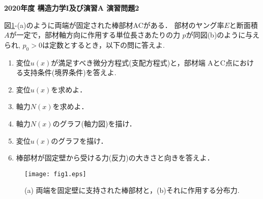 \documentclass[10pt,a4j]{jarticle}
\newlength{\minitwocolumn}
\begin{document}
\newcommand{\fat}[1]{\mbox{\boldmath $#1$}}
\newcommand{\D}{\partial}
\newcommand{\w}{\omega}
\newcommand{\ga}{\alpha}
\newcommand{\gb}{\beta}
\newcommand{\gx}{\xi}
\newcommand{\gz}{\zeta}
\newcommand{\vhat}[1]{\hat{\fat{#1}}}
\newcommand{\spc}{\vspace{0.7\baselineskip}}
\newcommand{\halfspc}{\vspace{0.3\baselineskip}}

\pagestyle{empty}
\newcommand{\twofig}[2]
 {
   \begin{figure}
     \begin{minipage}[t]{\minitwocolumn}
         \begin{center}   #1
         \end{center}
     \end{minipage}
         \hspace{\columnsep}
     \begin{minipage}[t]{\minitwocolumn}
         \begin{center} #2
         \end{center}
     \end{minipage}
   \end{figure}
 }
\begin{center}
	{\Large \bf 2020年度 構造力学I及び演習A 演習問題2 } \\
\end{center}
\vspace{15mm}
図\ref{fig:fig1}-(a)のように両端が固定された棒部材ACがある．
部材のヤング率$E$と断面積$A$が一定で，部材軸方向に作用する単位長さあたりの力
$p$が同図(b)のように与えられ, $p_0>0$は定数とするとき，以下の問に答えよ.
\begin{enumerate}
\item
	変位$u(x)$が満足すべき微分方程式(支配方程式)と，部材端
	AとC点における支持条件(境界条件)を答えよ. 
\item
	変位$u(x)$を求めよ．
\item
	軸力$N(x)$を求めよ．
\item
	軸力$N(x)$のグラフ(軸力図)を描け．
\item
	変位$u(x)$のグラフを描け．
\item
	棒部材が固定壁から受ける力(反力)の大きさと向きを答えよ．
\end{enumerate}
\begin{figure}[h]
	\vspace{-3mm}
	\begin{center}
	\texttt{[image: fig1.eps]} 
	\end{center}
	\vspace{-5mm}
	\caption{(a) 両端を固定壁に支持された棒部材と，(b)それに作用する分布力.} 
	\label{fig:fig1}
\end{figure}
\end{document}
